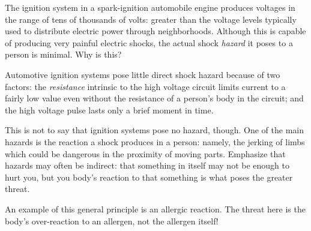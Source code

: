 

The ignition system in a spark-ignition automobile engine produces voltages in the range of tens of thousands of volts: greater than the voltage levels typically used to distribute electric power through neighborhoods.  Although this is capable of producing very painful electric shocks, the actual shock {\it hazard} it poses to a person is minimal.  Why is this?







Automotive ignition systems pose little direct shock hazard because of two factors: the {\it resistance} intrinsic to the high voltage circuit limits current to a fairly low value even without the resistance of a person's body in the circuit; and the high voltage pulse lasts only a brief moment in time.







This is not to say that ignition systems pose no hazard, though.  One of the main hazards is the reaction a shock produces in a person: namely, the jerking of limbs which could be dangerous in the proximity of moving parts.  Emphasize that hazards may often be indirect: that something in itself may not be enough to hurt you, but you body's reaction to that something is what poses the greater threat.  

An example of this general principle is an allergic reaction.  The threat here is the body's over-reaction to an allergen, not the allergen itself!




